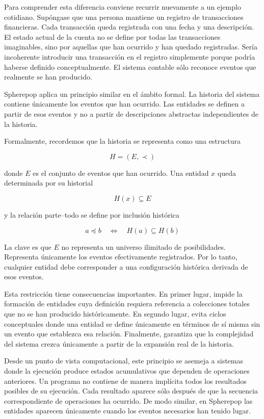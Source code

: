 \documentclass[12pt]{article}
\begin{document}
Para comprender esta diferencia conviene recurrir nuevamente a un ejemplo cotidiano. Supóngase que una persona mantiene un registro de transacciones financieras. Cada transacción queda registrada con una fecha y una descripción. El estado actual de la cuenta no se define por todas las transacciones imaginables, sino por aquellas que han ocurrido y han quedado registradas. Sería incoherente introducir una transacción en el registro simplemente porque podría haberse definido conceptualmente. El sistema contable sólo reconoce eventos que realmente se han producido.

Spherepop aplica un principio similar en el ámbito formal. La historia del sistema contiene únicamente los eventos que han ocurrido. Las entidades se definen a partir de esos eventos y no a partir de descripciones abstractas independientes de la historia.

Formalmente, recordemos que la historia se representa como una estructura

\[
H = (E, \prec)
\]

donde \(E\) es el conjunto de eventos que han ocurrido. Una entidad \(x\) queda determinada por su historial

\[
H(x) \subseteq E
\]

y la relación parte--todo se define por inclusión histórica

\[
a \preceq b \quad \Longleftrightarrow \quad H(a) \subseteq H(b)
\]

La clave es que \(E\) no representa un universo ilimitado de posibilidades. Representa únicamente los eventos efectivamente registrados. Por lo tanto, cualquier entidad debe corresponder a una configuración histórica derivada de esos eventos.

Esta restricción tiene consecuencias importantes. En primer lugar, impide la formación de entidades cuya definición requiera referencia a colecciones totales que no se han producido históricamente. En segundo lugar, evita ciclos conceptuales donde una entidad se define únicamente en términos de sí misma sin un evento que establezca esa relación. Finalmente, garantiza que la complejidad del sistema crezca únicamente a partir de la expansión real de la historia.

Desde un punto de vista computacional, este principio se asemeja a sistemas donde la ejecución produce estados acumulativos que dependen de operaciones anteriores. Un programa no contiene de manera implícita todos los resultados posibles de su ejecución. Cada resultado aparece sólo después de que la secuencia correspondiente de operaciones ha ocurrido. De modo similar, en Spherepop las entidades aparecen únicamente cuando los eventos necesarios han tenido lugar.
\end{document}
